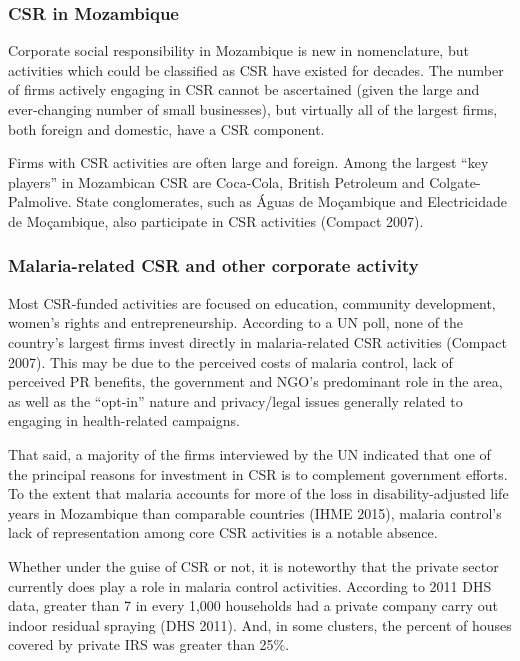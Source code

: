 \documentclass[]{elsarticle} %
\begin{document}
\subsubsection{CSR in Mozambique}\label{csr-in-mozambique}

Corporate social responsibility in Mozambique is new in nomenclature,
but activities which could be classified as CSR have existed for
decades. The number of firms actively engaging in CSR cannot be
ascertained (given the large and ever-changing number of small
businesses), but virtually all of the largest firms, both foreign and
domestic, have a CSR component.

Firms with CSR activities are often large and foreign. Among the largest
``key players'' in Mozambican CSR are Coca-Cola, British Petroleum and
Colgate-Palmolive. State conglomerates, such as Águas de Moçambique and
Electricidade de Moçambique, also participate in CSR activities (Compact
2007).

\subsubsection{Malaria-related CSR and other corporate
activity}\label{malaria-related-csr-and-other-corporate-activity}

Most CSR-funded activities are focused on education, community
development, women's rights and entrepreneurship. According to a UN
poll, none of the country's largest firms invest directly in
malaria-related CSR activities (Compact 2007). This may be due to the
perceived costs of malaria control, lack of perceived PR benefits, the
government and NGO's predominant role in the area, as well as the
``opt-in'' nature and privacy/legal issues generally related to engaging
in health-related campaigns.

That said, a majority of the firms interviewed by the UN indicated that
one of the principal reasons for investment in CSR is to complement
government efforts. To the extent that malaria accounts for more of the
loss in disability-adjusted life years in Mozambique than comparable
countries (IHME 2015), malaria control's lack of representation among
core CSR activities is a notable absence.

Whether under the guise of CSR or not, it is noteworthy that the private
sector currently does play a role in malaria control activities.
According to 2011 DHS data, greater than 7 in every 1,000 households had
a private company carry out indoor residual spraying (DHS 2011). And, in
some clusters, the percent of houses covered by private IRS was greater
than 25\%.
\end{document}
